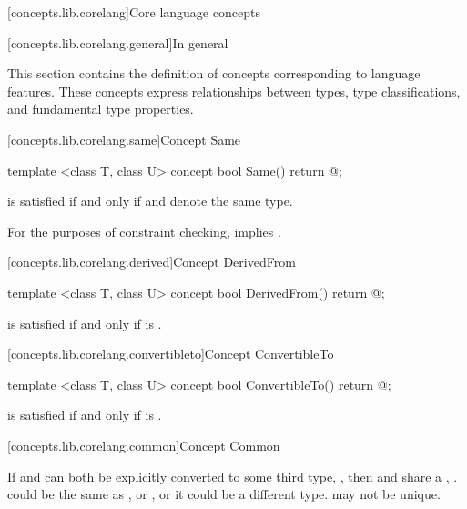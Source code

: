 \begin{addedblock}
[concepts.lib.corelang]{Core language concepts}

[concepts.lib.corelang.general]{In general}

\pnum
This section contains the definition of concepts corresponding to language features.
These concepts express relationships between types, type classifications, and
fundamental type properties.

[concepts.lib.corelang.same]{Concept Same}

%
\begin{itemdecl}
template <class T, class U>
concept bool Same() {
  return @\seebelow@;
}
\end{itemdecl}

\begin{itemdescr}
\pnum
{} is satisfied if and
only if  and  denote the same type.

\pnum
\remarks For the purposes of constraint checking,  implies
.
\end{itemdescr}

[concepts.lib.corelang.derived]{Concept DerivedFrom}

%
\begin{itemdecl}
template <class T, class U>
concept bool DerivedFrom() {
  return @\seebelow@;
}
\end{itemdecl}

\begin{itemdescr}
\pnum
{} is satisfied if and only if
 is .
\end{itemdescr}

[concepts.lib.corelang.convertibleto]{Concept ConvertibleTo}

%
\begin{itemdecl}
template <class T, class U>
concept bool ConvertibleTo() {
  return @\seebelow@;
}
\end{itemdecl}

\begin{itemdescr}
\pnum
{} is satisfied
if and only if  is .
\end{itemdescr}

[concepts.lib.corelang.common]{Concept Common}

\pnum
If  and  can both be explicitly converted to some third type,
, then  and  share a ,
. \enternote {} could be the same as , or , or
it could be a different type.  may not be unique.\exitnote


\end{addedblock}
